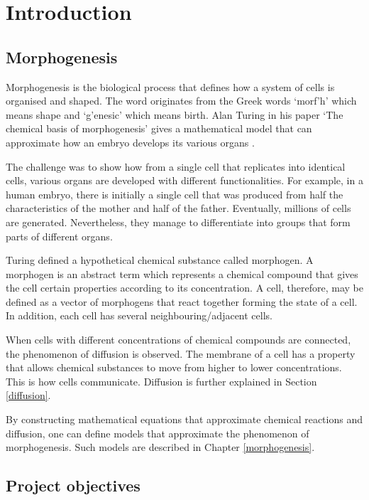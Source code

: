 \chapter{Introduction}

	\section{Morphogenesis}

	Morphogenesis is the biological process that defines how a system of cells is organised and shaped. The word originates from the Greek words `\greektext morf'h\latintext ' which means shape and `\greektext g'enesic\latintext ' which means birth. Alan Turing in his paper `The chemical basis of morphogenesis' gives a mathematical model that can approximate how an embryo develops its various organs \cite{turing_chemical_1990}. 
	
    The challenge was to show how from a single cell that replicates into identical cells, various organs are developed with different functionalities. For example, in a human embryo, there is initially a single cell that was produced from half the characteristics of the mother and half of the father. Eventually, millions of cells are generated. Nevertheless, they manage to differentiate into groups that form parts of different organs. 
	
Turing defined a hypothetical chemical substance called morphogen. A morphogen is an abstract term which represents a chemical compound that gives the cell certain properties according to its concentration. A cell, therefore, may be defined as a vector of morphogens that react together forming the state of a cell. In addition, each cell has several neighbouring/adjacent cells. 

When cells with different concentrations of chemical compounds are connected, the phenomenon of diffusion is observed. The membrane of a cell has a property that allows chemical substances to move from higher to lower concentrations. This is how cells communicate. Diffusion is further explained in Section \ref{diffusion}.
	
By constructing mathematical equations that approximate chemical reactions and diffusion, one can define models that approximate the phenomenon of morphogenesis. Such models are described in Chapter \ref{morphogenesis}.

	\section{Project objectives}
	
